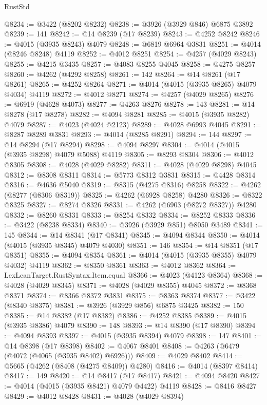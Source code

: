 \begin{lexlean}{RustStd}
\begin{coremodule}
@8234 := @3422 (@8202 @8232)
@8238 := @3926 (@3929 @846) @6875 @3892
@8239 := 141
@8242 := @14 @8239 (@17 @8239)
@8243 := @4252 @8242
@8246 := @4015 (@3935 @8243) @4079
@8248 := @6819 @6964 @3831
@8251 := @4014 (@8246 @8248) @4119
@8252 := @4012 @8251
@8254 := @4257 (@4029 @8243)
@8255 := @4215 @3435
@8257 := @4083 @8255 @4045
@8258 := @4275 @8257
@8260 := @4262 (@4292 @8258)
@8261 := 142
@8264 := @14 @8261 (@17 @8261)
@8265 := @4252 @8264
@8271 := @4014 (@4015 (@3935 @8265) @4079 @4034) @4119
@8272 := @4012 @8271
@8274 := @4257 (@4029 @8265)
@8276 := @6919 (@4628 @4073)
@8277 := @4263 @8276
@8278 := 143
@8281 := @14 @8278 (@17 @8278)
@8282 := @4094 @8281
@8285 := @4015 (@3935 @8282) @4079
@8287 := @4023 (@4024 @2123)
@8289 := @4028 @6993 @4045
@8291 := @8287 @8289 @3831
@8293 := @4014 (@8285 @8291)
@8294 := 144
@8297 := @14 @8294 (@17 @8294)
@8298 := @4094 @8297
@8304 := @4014 (@4015 (@3935 @8298) @4079 @5088) @4119
@8305 := @8293 @8304
@8306 := @4012 @8305
@8308 := @4028 (@4029 @8282)
@8311 := @4028 (@4029 @8298) @4045
@8312 := @8308 @8311
@8314 := @5773 @8312 @3831
@8315 := @4428 @8314
@8316 := @4636 @5040
@8319 := @8315 (@4275 @8316) @8258
@8322 := @4262 (@8277 (@8306 @8319))
@8325 := @4262 (@6928 @8258) @4280
@8326 := @8322 @8325
@8327 := @8274 @8326
@8331 := @4262 (@6903 (@8272 @8327)) @4280
@8332 := @8260 @8331
@8333 := @8254 @8332
@8334 := @8252 @8333
@8336 := @3422 (@8238 @8334)
@8340 := @3926 (@3929 @851) @8050 @3489
@8341 := 145
@8344 := @14 @8341 (@17 @8341)
@8345 := @4094 @8344
@8350 := @4014 (@4015 (@3935 @8345) @4079 @4030)
@8351 := 146
@8354 := @14 @8351 (@17 @8351)
@8355 := @4094 @8354
@8361 := @4014 (@4015 (@3935 @8355) @4079 @4032) @4119
@8362 := @8350 @8361
@8363 := @4012 @8362
@8364 := LexLeanTarget.RustSyntax.Item.equal
@8366 := @4023 (@4123 @8364)
@8368 := @4028 (@4029 @8345)
@8371 := @4028 (@4029 @8355) @4045
@8372 := @8368 @8371
@8374 := @8366 @8372 @3831
@8375 := @8363 @8374
@8377 := @3422 (@8340 @8375)
@8381 := @3926 (@3929 @856) @6875 @3425
@8382 := 150
@8385 := @14 @8382 (@17 @8382)
@8386 := @4252 @8385
@8389 := @4015 (@3935 @8386) @4079
@8390 := 148
@8393 := @14 @8390 (@17 @8390)
@8394 := @4094 @8393
@8397 := @4015 (@3935 @8394) @4079
@8398 := 147
@8401 := @14 @8398 (@17 @8398)
@8402 := @4067 @8401
@8408 := @4263 (@6479 (@4072 (@4065 (@3935 @8402) @6926)))
@8409 := @4029 @8402
@8414 := @5665 (@4262 (@8408 (@4275 @8409)) @4280)
@8416 := @4014 (@8397 @8414)
@8417 := 149
@8420 := @14 @8417 (@17 @8417)
@8421 := @4094 @8420
@8427 := @4014 (@4015 (@3935 @8421) @4079 @4422) @4119
@8428 := @8416 @8427
@8429 := @4012 @8428
@8431 := @4028 (@4029 @8394)

\end{coremodule}
\end{lexlean}
